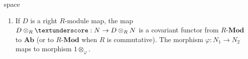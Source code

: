 \begin{example}{\color{white}space}
\begin{enumerate}[label=(\roman*)]
Thus $\varphi': \hom_R(N_2, D) \rightarrow \hom_R(N_1, D)$ by $\varphi'(g) = g \circ \varphi$. The map
\begin{align}
\hom(\textunderscore, D): N &\rightarrow \hom_R (N, D) \nonumber \\
\hom(\textunderscore, D): \varphi &\rightarrow \varphi' \nonumber
\end{align}
is a  from $R$-$\textbf{Mod}$ to $\textbf{Grp}$. If $R$ is commutative, it maps $R$-$\textbf{Mod}$ to itself.
\item If $D$ is a right $R$-module map, the map $D \otimes_{R} \textunderscore : N \rightarrow D \otimes_{R} N$ is a covariant functor from $R$-$\textbf{Mod}$ to $\textbf{Ab}$ (or to $R$-$\textbf{Mod}$ when $R$ is commutative). The morphism $\varphi: N_1 \rightarrow N_2$ maps to morphism $1 \otimes_{\varphi}$.
\end{enumerate}
\end{example}

\begin{definition}
\end{definition}




